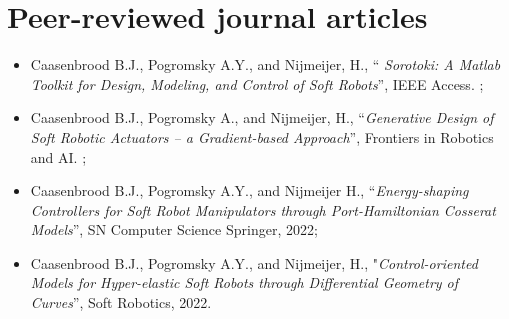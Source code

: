 \section*{Peer-reviewed journal articles}
\begin{itemize}[leftmargin=2mm]
\small
\setlength\itemsep{0.0em}
\item Caasenbrood B.J., Pogromsky A.Y., and Nijmeijer, H., “\textit{ Sorotoki: A Matlab Toolkit for Design, Modeling, and Control of Soft Robots}”, IEEE Access. \cur;

\item Caasenbrood B.J., Pogromsky A., and Nijmeijer, H., “\textit{Generative Design of Soft Robotic Actuators -- a Gradient-based Approach}”, Frontiers in Robotics and AI. \ipj;

\item  Caasenbrood B.J., Pogromsky A.Y., and Nijmeijer H., “\textit{Energy-shaping Controllers for Soft Robot Manipulators through Port-Hamiltonian Cosserat Models}”, SN Computer Science Springer, 2022;
\item Caasenbrood B.J., Pogromsky A.Y., and Nijmeijer, H., "\textit{Control-oriented Models for Hyper-elastic Soft Robots through Differential Geometry of Curves}”, Soft Robotics, 2022.
\end{itemize}

